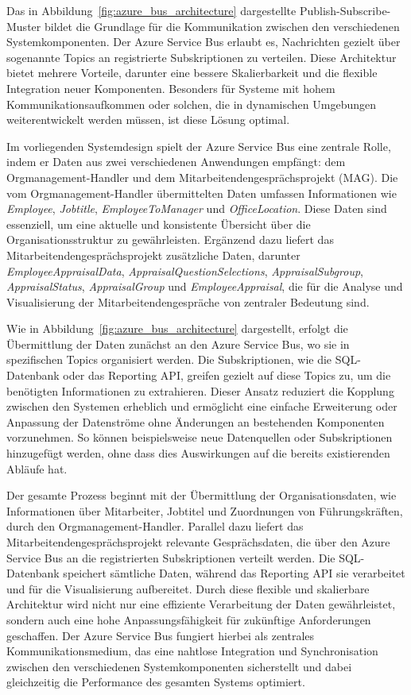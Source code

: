 Das in Abbildung~\ref{fig:azure_bus_architecture} dargestellte Publish-Subscribe-Muster bildet die Grundlage für die Kommunikation zwischen den verschiedenen Systemkomponenten. Der Azure Service Bus erlaubt es, Nachrichten gezielt über sogenannte Topics an registrierte Subskriptionen zu verteilen. Diese Architektur bietet mehrere Vorteile, darunter eine bessere Skalierbarkeit und die flexible Integration neuer Komponenten. Besonders für Systeme mit hohem Kommunikationsaufkommen oder solchen, die in dynamischen Umgebungen weiterentwickelt werden müssen, ist diese Lösung optimal.

Im vorliegenden Systemdesign spielt der Azure Service Bus eine zentrale Rolle, indem er Daten aus zwei verschiedenen Anwendungen empfängt: dem Orgmanagement-Handler und dem Mitarbeitendengesprächsprojekt (MAG). Die vom Orgmanagement-Handler übermittelten Daten umfassen Informationen wie \textit{Employee}, \textit{Jobtitle}, \textit{EmployeeToManager} und \textit{OfficeLocation}. Diese Daten sind essenziell, um eine aktuelle und konsistente Übersicht über die Organisationsstruktur zu gewährleisten. Ergänzend dazu liefert das Mitarbeitendengesprächsprojekt zusätzliche Daten, darunter \textit{EmployeeAppraisalData}, \textit{AppraisalQuestionSelections}, \textit{AppraisalSubgroup}, \textit{AppraisalStatus}, \textit{AppraisalGroup} und \textit{EmployeeAppraisal}, die für die Analyse und Visualisierung der Mitarbeitendengespräche von zentraler Bedeutung sind.

Wie in Abbildung~\ref{fig:azure_bus_architecture} dargestellt, erfolgt die Übermittlung der Daten zunächst an den Azure Service Bus, wo sie in spezifischen Topics organisiert werden. Die Subskriptionen, wie die SQL-Datenbank oder das Reporting API, greifen gezielt auf diese Topics zu, um die benötigten Informationen zu extrahieren. Dieser Ansatz reduziert die Kopplung zwischen den Systemen erheblich und ermöglicht eine einfache Erweiterung oder Anpassung der Datenströme ohne Änderungen an bestehenden Komponenten vorzunehmen. So können beispielsweise neue Datenquellen oder Subskriptionen hinzugefügt werden, ohne dass dies Auswirkungen auf die bereits existierenden Abläufe hat.

Der gesamte Prozess beginnt mit der Übermittlung der Organisationsdaten, wie Informationen über Mitarbeiter, Jobtitel und Zuordnungen von Führungskräften, durch den Orgmanagement-Handler. Parallel dazu liefert das Mitarbeitendengesprächsprojekt relevante Gesprächsdaten, die über den Azure Service Bus an die registrierten Subskriptionen verteilt werden. Die SQL-Datenbank speichert sämtliche Daten, während das Reporting API sie verarbeitet und für die Visualisierung aufbereitet. Durch diese flexible und skalierbare Architektur wird nicht nur eine effiziente Verarbeitung der Daten gewährleistet, sondern auch eine hohe Anpassungsfähigkeit für zukünftige Anforderungen geschaffen. Der Azure Service Bus fungiert hierbei als zentrales Kommunikationsmedium, das eine nahtlose Integration und Synchronisation zwischen den verschiedenen Systemkomponenten sicherstellt und dabei gleichzeitig die Performance des gesamten Systems optimiert.


